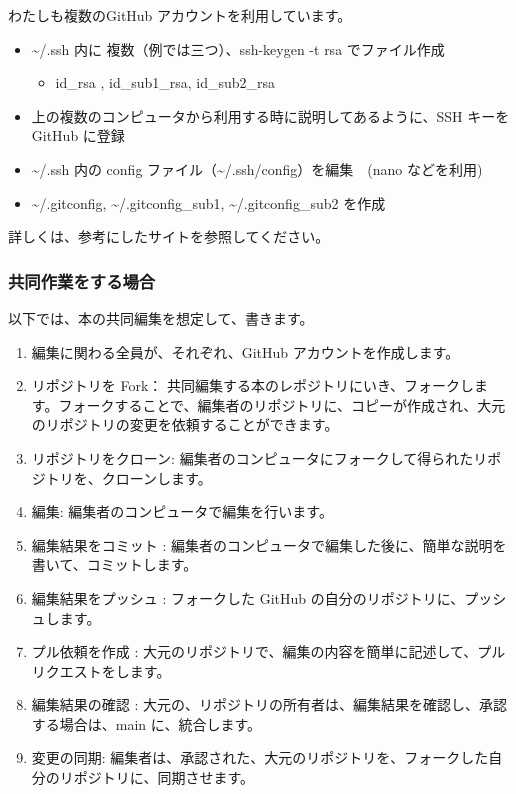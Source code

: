 \documentclass[
]{bxjsbook}
\providecommand{\tightlist}{%
  \setlength{\itemsep}{0pt}\setlength{\parskip}{0pt}}
\theoremstyle{definition}
\theoremstyle{definition}
\theoremstyle{definition}
\theoremstyle{definition}
\theoremstyle{remark}
\begin{document}
わたしも複数のGitHub アカウントを利用しています。

\begin{itemize}
\tightlist
\item
  \textasciitilde/.ssh 内に 複数（例では三つ）、ssh-keygen -t rsa でファイル作成

  \begin{itemize}
  \tightlist
  \item
    id\_rsa , id\_sub1\_rsa, id\_sub2\_rsa
  \end{itemize}
\item
  上の複数のコンピュータから利用する時に説明してあるように、SSH キーを GitHub に登録
\item
  \textasciitilde/.ssh 内の config ファイル（\textasciitilde/.ssh/config）を編集　(nano などを利用)
\item
  \textasciitilde/.gitconfig, \textasciitilde/.gitconfig\_sub1, \textasciitilde/.gitconfig\_sub2 を作成
\end{itemize}

詳しくは、参考にしたサイトを参照してください。

\hypertarget{ux5171ux540cux4f5cux696dux3092ux3059ux308bux5834ux5408}{%
\subsubsection{共同作業をする場合}\label{ux5171ux540cux4f5cux696dux3092ux3059ux308bux5834ux5408}}

以下では、本の共同編集を想定して、書きます。

\begin{enumerate}
\def\labelenumi{\arabic{enumi}.}
\item
  編集に関わる全員が、それぞれ、GitHub アカウントを作成します。
\item
  リポジトリを Fork： 共同編集する本のレポジトリにいき、フォークします。フォークすることで、編集者のリポジトリに、コピーが作成され、大元のリポジトリの変更を依頼することができます。
\item
  リポジトリをクローン: 編集者のコンピュータにフォークして得られたリポジトリを、クローンします。
\item
  編集: 編集者のコンピュータで編集を行います。
\item
  編集結果をコミット : 編集者のコンピュータで編集した後に、簡単な説明を書いて、コミットします。
\item
  編集結果をプッシュ : フォークした GitHub の自分のリポジトリに、プッシュします。
\item
  プル依頼を作成 : 大元のリポジトリで、編集の内容を簡単に記述して、プルリクエストをします。
\item
  編集結果の確認 : 大元の、リポジトリの所有者は、編集結果を確認し、承認する場合は、main に、統合します。
\item
  変更の同期: 編集者は、承認された、大元のリポジトリを、フォークした自分のリポジトリに、同期させます。
\end{enumerate}
\end{document}

